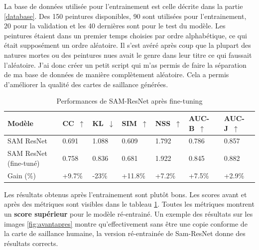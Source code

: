 \par
La base de données utilisée pour l'entrainement est celle décrite dans la partie \ref{database}. Des 150 peintures disponibles, 90 sont utilisées pour l'entrainement, 20 pour la validation et les 40 dernières sont pour le test du modèle. Les peintures étaient dans un premier temps choisies par ordre alphabétique, ce qui était supposément un ordre aléatoire. Il s'est avéré après coup que la plupart des natures mortes ou des peintures nues avait le genre dans leur titre ce qui faussait l'aléatoire. J'ai donc créer un petit script qui m'as permis de faire la séparation de ma base de données de manière complètement aléatoire. Cela a permis d'améliorer la qualité des cartes de saillance générées.

\begin{table}[ht]
    \centering
    \begin{tabular}{|l|l|l|l|l|l|l|}
        \hline
        Modèle & CC~$\uparrow$ & KL~$\downarrow$ & SIM~$\uparrow$ & NSS~$\uparrow$ & AUC-B~$\uparrow$ & AUC-J~$\uparrow$\\
        \hline
        SAM ResNet              & 0.691 & 1.088 & 0.609 & 1.792 & 0.786 & 0.857\\
        SAM ResNet (fine-tuné)  & 0.758 & 0.836 & 0.681 & 1.922 & 0.845 & 0.882\\
        \hline
        Gain (\%)               & +9.7\% & -23\% & +11.8\% & +7.2\% & +7.5\% & +2.9\%\\
        \hline
    \end{tabular}
    \caption{Performances de SAM-ResNet après fine-tuning}
    \label{tab:scoresfinetuned}
\end{table}

\par
Les résultats obtenus après l'entrainement sont plutôt bons. Les scores avant et après des métriques sont visibles dans le tableau \ref{tab:scoresfinetuned}. Toutes les métriques montrent un \textbf{score supérieur} pour le modèle ré-entrainé. Un exemple des résultats sur les images \ref{fig:avantapres} montre qu'effectivement sans être une copie conforme de la carte de saillance humaine, la version ré-entrainée de Sam-ResNet donne des résultats corrects.

